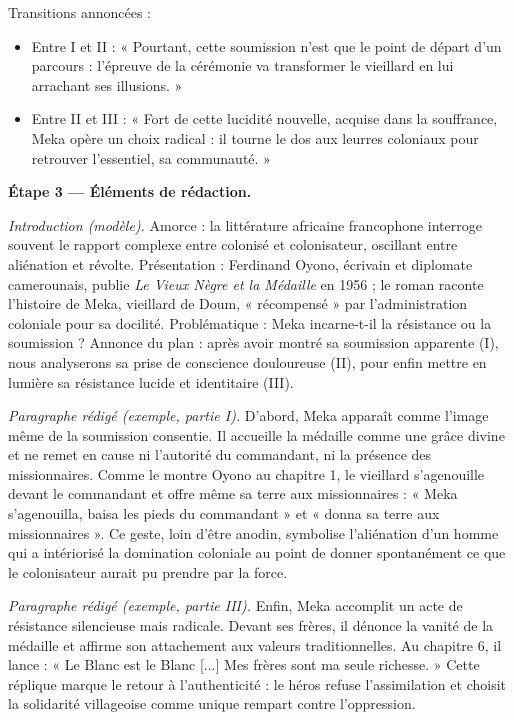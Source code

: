 \documentclass[11pt]{article}
\begin{document}
\begin{exoresolu}
Transitions annoncées :
\begin{itemize}
\item Entre I et II : « Pourtant, cette soumission n'est que le point de départ d'un parcours : l'épreuve de la cérémonie va transformer le vieillard en lui arrachant ses illusions. »
\item Entre II et III : « Fort de cette lucidité nouvelle, acquise dans la souffrance, Meka opère un choix radical : il tourne le dos aux leurres coloniaux pour retrouver l'essentiel, sa communauté. »
\end{itemize}

\textbf{Étape 3 — Éléments de rédaction.}

\emph{Introduction (modèle).} Amorce : la littérature africaine francophone interroge souvent le rapport complexe entre colonisé et colonisateur, oscillant entre aliénation et révolte. Présentation : Ferdinand Oyono, écrivain et diplomate camerounais, publie \emph{Le Vieux Nègre et la Médaille} en 1956 ; le roman raconte l'histoire de Meka, vieillard de Doum, « récompensé » par l'administration coloniale pour sa docilité. Problématique : Meka incarne-t-il la résistance ou la soumission ? Annonce du plan : après avoir montré sa soumission apparente (I), nous analyserons sa prise de conscience douloureuse (II), pour enfin mettre en lumière sa résistance lucide et identitaire (III).

\emph{Paragraphe rédigé (exemple, partie I).} D'abord, Meka apparaît comme l'image même de la soumission consentie. Il accueille la médaille comme une grâce divine et ne remet en cause ni l'autorité du commandant, ni la présence des missionnaires. Comme le montre Oyono au chapitre 1, le vieillard s'agenouille devant le commandant et offre même sa terre aux missionnaires : « Meka s'agenouilla, baisa les pieds du commandant » et « donna sa terre aux missionnaires ». Ce geste, loin d'être anodin, symbolise l'aliénation d'un homme qui a intériorisé la domination coloniale au point de donner spontanément ce que le colonisateur aurait pu prendre par la force.

\emph{Paragraphe rédigé (exemple, partie III).} Enfin, Meka accomplit un acte de résistance silencieuse mais radicale. Devant ses frères, il dénonce la vanité de la médaille et affirme son attachement aux valeurs traditionnelles. Au chapitre 6, il lance : « Le Blanc est le Blanc [...] Mes frères sont ma seule richesse. » Cette réplique marque le retour à l'authenticité : le héros refuse l'assimilation et choisit la solidarité villageoise comme unique rempart contre l'oppression.


\end{exoresolu}
\end{document}
